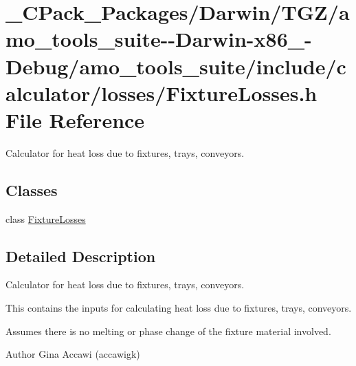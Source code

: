 \hypertarget{___c_pack___packages_2_darwin_2_t_g_z_2amo__tools__suite--_darwin-x86__64-_debug_2amo__tools__su6743e519da5abeadea11f1f9fb464bab}{}\section{\+\_\+\+C\+Pack\+\_\+\+Packages/\+Darwin/\+T\+G\+Z/amo\+\_\+tools\+\_\+suite-\/-\/\+Darwin-\/x86\+\_-\/\+Debug/amo\+\_\+tools\+\_\+suite/include/calculator/losses/\+Fixture\+Losses.h File Reference}
\label{___c_pack___packages_2_darwin_2_t_g_z_2amo__tools__suite--_darwin-x86__64-_debug_2amo__tools__su6743e519da5abeadea11f1f9fb464bab}


Calculator for heat loss due to fixtures, trays, conveyors.  


\subsection*{Classes}
\begin{DoxyCompactItemize}
\item 
class \hyperlink{class_fixture_losses}{Fixture\+Losses}
\end{DoxyCompactItemize}


\subsection{Detailed Description}
Calculator for heat loss due to fixtures, trays, conveyors. 

This contains the inputs for calculating heat loss due to fixtures, trays, conveyors.

Assumes there is no melting or phase change of the fixture material involved.

\begin{DoxyAuthor}{Author}
Gina Accawi (accawigk) 
\end{DoxyAuthor}
